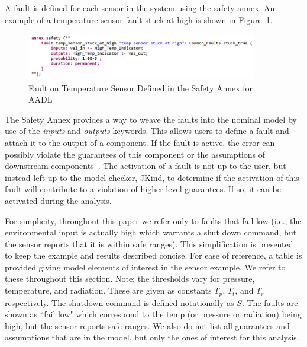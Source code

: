 A fault is defined for each sensor in the system using the safety annex. An example of a temperature sensor fault stuck at high is shown in Figure~\ref{fig:tempSensorFault}.

\begin{figure}[h!]
	\vspace{-2em}
	\begin{center}
		\includegraphics[width=0.9\textwidth]{images/tempSensorFault.PNG}
	\end{center}
	\vspace{-2em}
	\caption{Fault on Temperature Sensor Defined in the Safety Annex for AADL}
	\label{fig:tempSensorFault}
	\vspace{-2em}
\end{figure}

The Safety Annex provides a way to weave the faults into the nominal model by use of the \emph{inputs} and \emph{outputs} keywords. This allows users to define a fault and attach it to the output of a component. If the fault is active, the error can possibly violate the guarantees of this component or the assumptions of downstream components~\cite{stewart2020safety}. The activation of a fault is not up to the user, but instead left up to the model checker, JKind, to determine if the activation of this fault will contribute to a violation of higher level guarantees. If so, it can be activated during the analysis.

For simplicity, throughout this paper we refer only to faults that fail low (i.e., the environmental input is actually high which warrants a shut down command, but the sensor reports that it is within safe ranges). This simplification is presented to keep the example and results described concise. For ease of reference, a table is provided giving model elements of interest in the sensor example. We refer to these throughout this section. Note: the thresholds vary for pressure, temperature, and radiation. These are given as constants $T_p$, $T_t$, and $T_r$ respectively. The shutdown command is defined notationally as $S$.  The faults are shown as ``fail low" which correspond to the temp (or pressure or radiation) being high, but the sensor reports safe ranges. We also do not list all guarantees and assumptions that are in the model, but only the ones of interest for this analysis. 

